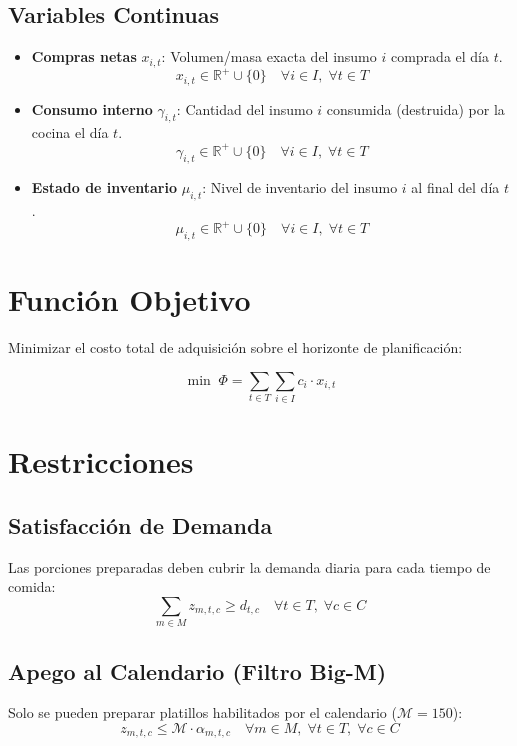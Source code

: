 \documentclass[12pt, letterpaper]{article}
\begin{document}
\subsection{Variables Continuas}

\begin{itemize}
  \item \textbf{Compras netas} $x_{i,t}$: Volumen/masa exacta del insumo $i$ comprada el día $t$.
  \[
    x_{i,t} \in \mathbb{R}^+ \cup \{0\} \quad \forall i \in I,\; \forall t \in T
  \]
  \item \textbf{Consumo interno} $\gamma_{i,t}$: Cantidad del insumo $i$ consumida (destruida) por la cocina el día $t$.
  \[
    \gamma_{i,t} \in \mathbb{R}^+ \cup \{0\} \quad \forall i \in I,\; \forall t \in T
  \]
  \item \textbf{Estado de inventario} $\mu_{i,t}$: Nivel de inventario del insumo $i$ al final del día $t$.
  \[
    \mu_{i,t} \in \mathbb{R}^+ \cup \{0\} \quad \forall i \in I,\; \forall t \in T
  \]
\end{itemize}

\section{Función Objetivo}

Minimizar el costo total de adquisición sobre el horizonte de planificación:

\[
  \min \;\Phi = \sum_{t \in T} \sum_{i \in I} c_i \cdot x_{i,t} \tag{7}
\]

\section{Restricciones}

\subsection{Satisfacción de Demanda}
Las porciones preparadas deben cubrir la demanda diaria para cada tiempo de comida:
\[
  \sum_{m \in M} z_{m,t,c} \geq d_{t,c} \quad \forall t \in T,\; \forall c \in C \tag{8}
\]

\subsection{Apego al Calendario (Filtro Big-M)}
Solo se pueden preparar platillos habilitados por el calendario ($\mathcal{M} = 150$):
\[
  z_{m,t,c} \leq \mathcal{M} \cdot \alpha_{m,t,c} \quad \forall m \in M,\; \forall t \in T,\; \forall c \in C \tag{9}
\]
\end{document}
